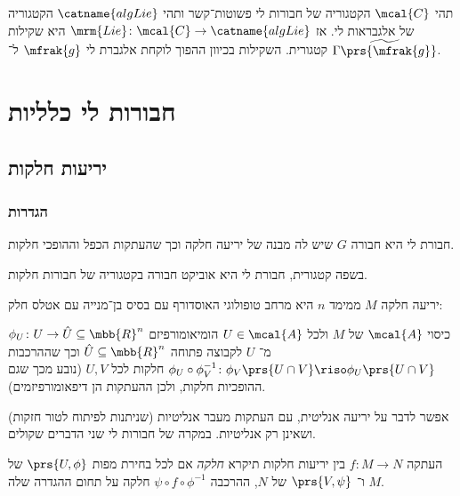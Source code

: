 \documentclass[10pt, twoside]{book}
\newcommand{\Lie}{\mrm{Lie}}
\begin{document}
\begin{proposition}
תהי
$\mcal{C}$
הקטגוריה של חבורות לי פשוטות־קשר ותהי
$\catname{algLie}$
הקטגוריה של אלגבראות לי. אז
$\Lie \colon \mcal{C} \to \catname{algLie}$
היא שקילות קטגורית.
השקילות בכיוון ההפוך לוקחת אלגברת לי
$\mfrak{g}$
ל־%
$\widetilde{\Gamma\prs{\mfrak{g}}}$.
\end{proposition}

\chapter{חבורות לי כלליות}

\section{יריעות חלקות}

\subsection{הגדרות}

\begin{definition}[חבורת לי]
חבורת לי היא חבורה
$G$
שיש לה מבנה של יריעה חלקה וכך שהעתקות הכפל וההופכי חלקות.
\end{definition}

\begin{remark}
בשפה קטגורית, חבורת לי היא אוביקט חבורה בקטגוריה של חבורות חלקות.
\end{remark}

\begin{definition}
יריעה חלקה
$M$
ממימד
$n$
היא מרחב טופולוגי האוסדורף עם בסיס בן־מנייה עם אטלס חלק:

כיסוי
$\mcal{A}$
של
$M$
ולכל
$U \in \mcal{A}$
הומיאומורפיזם
$\phi_{U} \colon U \to \hat{U} \subseteq \mbb{R}^n$
מ־%
$U$
לקבוצה פתוחה
$\hat{U} \subseteq \mbb{R}^n$
וכך שההרכבות
$\phi_U \circ \phi_V^{-1} \colon \phi_V \prs{U \cap V} \riso \phi_U \prs{U \cap V}$
חלקות לכל
$U,V$
(נובע מכך שגם ההופכיות חלקות, ולכן ההעתקות הן דיפאומורפיזמים).
\end{definition}


\begin{remark}
אפשר לדבר על יריעה אנליטית, עם העתקות מעבר אנליטיות (שניתנות לפיתוח לטור חזקות) ושאינן רק אנליטיות. במקרה של חבורות לי שני הדברים שקולים.
\end{remark}

\begin{definition}
העתקה
$f \colon M \to N$
בין יריעות חלקות תיקרא
\emph{חלקה}
אם לכל בחירת מפות
$\prs{U,\phi}$
של
$M$
ו־%
$\prs{V,\psi}$
של
$N$,
ההרכבה
$\psi \circ f \circ \phi^{-1}$
חלקה על תחום ההגדרה שלה.
\end{definition}
\end{document}
